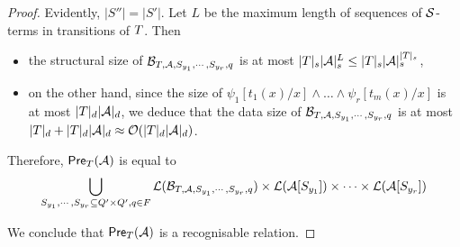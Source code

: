 \begin{proof}
%
%
Evidently, $|S''| = |S'|$.  Let $L$ be the maximum length of sequences of $\mathcal{S}$-terms in transitions of $T$. Then 
\begin{itemize}
\item the structural size of $\mathcal{B}_{T, \mathcal{A}, S_{y_1}, \cdots, S_{y_r}, q}$ is at most $|T|_s |\mathcal{A}|_s^{L} \le |T|_s |\mathcal{A}|_s^{|T|_s}$,
%
\item  on the other hand, since the size of $\psi_1[t_1(x)/x] \wedge \ldots \wedge \psi_r[t_m(x)/x]$ is at most $|T|_d |\mathcal{A}|_d$, we deduce that the data size of $\mathcal{B}_{T, \mathcal{A}, S_{y_1}, \cdots, S_{y_r}, q}$ is at most $|T|_d + |T|_d |\mathcal{A}|_d \approx \mathcal{O}(|T|_d |\mathcal{A}|_d)$.
\end{itemize}


Therefore, $\textsf{Pre}_{T}(\mathcal{A})$ is equal to 
\[
\bigcup_{S_{y_1}, \cdots, S_{y_r} \subseteq Q' \times Q', q\in F} \mathcal{L}(\mathcal{B}_{T, \mathcal{A}, S_{y_1}, \cdots, S_{y_r},q}) \times \mathcal{L}(\mathcal{A}[S_{y_1}]) \times \cdots  \times \mathcal{L}(\mathcal{A}[S_{y_r}])\]

We conclude that $\textsf{Pre}_{T}(\mathcal{A})$ is a recognisable relation. 


\end{proof}
